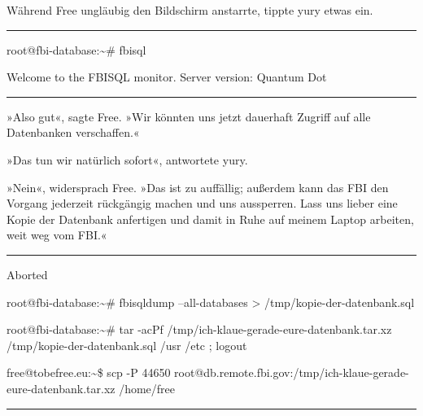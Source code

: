 Während Free ungläubig den Bildschirm anstarrte, tippte yury etwas ein.

\noindent \parbox{\textwidth}{ \vspace{3ex} \hrule \vspace{3ex}

    \begin{footnotesize}
    \begin{ttfamily}

\noindent root@fbi-database:\textasciitilde{}\# fbisql

\noindent Welcome to the FBISQL monitor. Server version: Quantum Dot

    \end{ttfamily}
    \end{footnotesize}

\vspace{3ex} \hrule \vspace{3ex} }

»Also gut«, sagte Free. »Wir könnten uns jetzt dauerhaft Zugriff auf alle Datenbanken verschaffen.«

»Das tun wir natürlich sofort«, antwortete yury.

»Nein«, widersprach Free. »Das ist zu auffällig; außerdem kann das FBI den Vorgang jederzeit rückgängig machen und uns aussperren. Lass uns lieber eine Kopie der Datenbank anfertigen und damit in Ruhe auf meinem Laptop arbeiten, weit weg vom FBI.«

\noindent \parbox{\textwidth}{ \vspace{3ex} \hrule \vspace{3ex}

    \begin{footnotesize}
    \begin{ttfamily}

\noindent Aborted

\noindent root@fbi-database:\textasciitilde{}\# fbisqldump --all-databases > /tmp/kopie-der-datenbank.sql

\noindent root@fbi-database:\textasciitilde{}\# tar -acPf /tmp/ich-klaue-gerade-eure-datenbank.tar.xz /tmp/kopie-der-datenbank.sql /usr /etc ; logout

\noindent free@tobefree.eu:\textasciitilde{}\$ scp -P 44650 root@db.remote.fbi.gov:/tmp/ich-klaue-gerade-eure-datenbank.tar.xz /home/free

    \end{ttfamily}
    \end{footnotesize}

\vspace{3ex} \hrule \vspace{3ex} }

